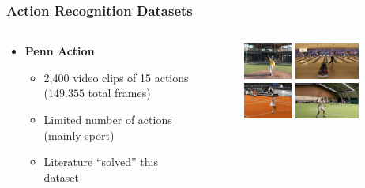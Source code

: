 \documentclass[9pt]{beamer}
\providecommand{\source}{\\ \footnotesize \tugreen{Source:} \footnotemark}
\newenvironment{myframe}[1][]{%
\begin{frame}%
\frametitle{#1}
\setcounter{footnote}{0}


}{%
\end{frame}%
}
\begin{document}
\begin{myframe}[Action Recognition Datasets]
  \begin{columns}[T]
      \begin{column}{.48\textwidth}
          \vspace{20px}
          \begin{itemize}
              \item \textbf{Penn Action\footnotemark}
              \begin{itemize}
                  \item 2,400 video clips of 15 actions ($149.355$ total frames)
                  \item Limited number of actions (mainly sport)
                  \item Literature ``solved'' this dataset
              \end{itemize}
          \end{itemize}
      \end{column}
      \begin{column}{.48\textwidth}
          \begin{figure}
              \includegraphics[height=45px]{pa-01.jpg}
              \includegraphics[height=45px]{pa-02.jpg}
              \includegraphics[height=45px]{pa-03.jpg}
              \includegraphics[height=45px]{pa-04.jpg}
              \source
          \end{figure}
      \end{column}
  \end{columns}
\end{myframe}
\end{document}

